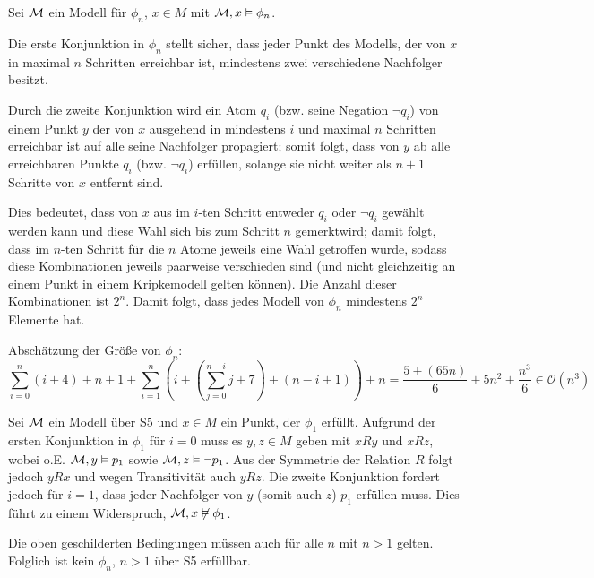 Sei $\mathcal{M}$ ein Modell für $\phi_n$, $x\in M$ mit $\mathcal{M}, x \vDash
\phi_n$.

Die erste Konjunktion in $\phi_n$ stellt sicher, dass jeder Punkt des
Modells, der von $x$ in maximal $n$ Schritten erreichbar ist, mindestens zwei
verschiedene Nachfolger besitzt.

Durch die zweite Konjunktion wird ein Atom $q_i$ (bzw. seine Negation $\neg q_i$)
von einem Punkt $y$ der von $x$ ausgehend in mindestens $i$ und maximal $n$
Schritten erreichbar ist auf alle seine Nachfolger propagiert; somit folgt,
dass von $y$ ab alle erreichbaren Punkte $q_i$ (bzw. $\neg q_i$) erfüllen,
solange sie nicht weiter als $n+1$ Schritte von $x$ entfernt sind.

Dies bedeutet, dass von $x$ aus im $i$-ten Schritt entweder $q_i$ oder $\neg
q_i$ gewählt werden kann und diese Wahl sich bis zum Schritt $n$ \glqq
gemerkt\grqq wird; damit folgt, dass im $n$-ten Schritt für die $n$ Atome
jeweils eine Wahl getroffen wurde, sodass diese Kombinationen jeweils paarweise
verschieden sind (und nicht gleichzeitig an einem Punkt in einem Kripkemodell
gelten können). Die Anzahl dieser Kombinationen ist $2^n$. Damit folgt, dass
jedes Modell von $\phi_n$ mindestens $2^n$ Elemente hat.

Abschätzung der Größe von $\phi_n$:
\[
\sum_{i=0}^{n}(i + 4) + n + 1 + \sum_{i=1}^{n}\left(i + \left(\sum_{j=0}^{n-i}
j + 7\right) + (n - i + 1) \right) + n = \frac{5+(65 n)}{6}+5 n^2+\frac{n^3}{6}
\in \mathcal{O}(n^3)
\]

Sei $\mathcal{M}$ ein Modell über S5 und $x \in M$ ein Punkt, der $\phi_1$ erfüllt. Aufgrund der ersten Konjunktion in
$\phi_1$ für $i = 0$ muss es $y, z \in M$ geben mit $xRy$ und $xRz$, wobei o.E. $\mathcal{M}, y \vDash p_1$ sowie
$\mathcal{M}, z \vDash \neg p_1$. Aus der Symmetrie der Relation $R$ folgt jedoch $yRx$ und wegen Transitivität auch
$yRz$. Die zweite Konjunktion fordert jedoch für $i = 1$, dass jeder Nachfolger von $y$ (somit auch $z$) $p_1$ erfüllen
muss. Dies führt zu einem Widerspruch, $\mathcal{M}, x \not\vDash \phi_1$.

Die oben geschilderten Bedingungen müssen auch für alle $n$ mit $n > 1$ gelten. Folglich ist kein $\phi_n$, $n > 1$ über
S5 erfüllbar.

